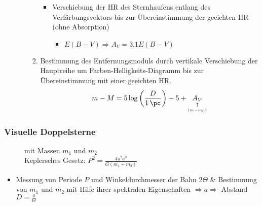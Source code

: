 \begin{itemize}
\begin{itemize}
\begin{enumerate}[label={$(\roman*)$}]
\begin{figure}[H]
						\end{figure}
						\begin{itemize}[label={$\to$}]
							\item Verschiebung der HR des Sternhaufens entlang des Verfärbungsvektors bis zur Übereinstimmung der geeichten HR (ohne Absorption)
								\begin{itemize}[label={$\Rightarrow$}]
									\item $E(B-V)\Rightarrow A_V=\num{3.1}E(B-V)$
								\end{itemize}
						\end{itemize}
					\item Bestimmung des Entfernungsmoduls durch vertikale Verschiebung der Hauptreihe um Farben-Helligkeits-Diagramm bis zur Übereinstimmung mit einer geeichten HR.
						\begin{equation*}
							m-M=5\log\left(\frac{D}{\SI{1}{\pc}}\right)-5+\underset{\underset{(m-m_0)}{\uparrow}}{A_V}
						\end{equation*}
				\end{enumerate}
		\end{itemize}
\end{itemize}
\subsubsection{Visuelle Doppelsterne}
\begin{figure}[H]
	\begin{multicols}{2}
		\begin{figure}[H]
			\centering
		\end{figure}\columnbreak
		mit Massen $m_1$ und $m_2$\\
		Keplersches Gesetz: $P^2=\frac{4\pi^2a^3}{G(m_1+m_2)}$
	\end{multicols}
\end{figure}
\begin{itemize}
	\item Messung von Periode $P$ und Winkeldurchmesser der Bahn $2\Theta$ \& Bestimmung von $m_1$ und $m_2$ mit Hilfe ihrer spektralen Eigenschaften $\Rightarrow a \Rightarrow $ Abstand $D=\frac{a}{\Theta}$
\end{itemize}
